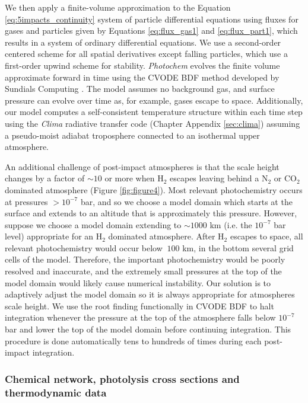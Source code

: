 We then apply a finite-volume approximation to the Equation \eqref{eq:5impacts_continuity} system of particle differential equations using fluxes for gases and particles given by Equations \eqref{eq:flux_gas1} and \eqref{eq:flux_part1}, which results in a system of ordinary differential equations. We use a second-order centered scheme for all spatial derivatives except falling particles, which use a first-order upwind scheme for stability. \emph{Photochem} evolves the finite volume approximate forward in time using the CVODE BDF method developed by Sundials Computing \citep{Hindmarsh_2005}. The model assumes no background gas, and surface pressure can evolve over time as, for example, gases escape to space. Additionally, our model computes a self-consistent temperature structure within each time step using the \emph{Clima} radiative transfer code (Chapter Appendix \ref{sec:clima}) assuming a pseudo-moist adiabat troposphere connected to an isothermal upper atmosphere.

An additional challenge of post-impact atmospheres is that the scale height changes by a factor of $\sim 10$ or more when H$_2$ escapes leaving behind a N$_2$ or CO$_2$ dominated atmosphere (Figure \ref{fig:figure4}). Most relevant photochemistry occurs at pressures $> 10^{-7}$ bar, and so we choose a model domain which starts at the surface and extends to an altitude that is approximately this pressure. However, suppose we choose a model domain extending to $\sim 1000$ km (i.e. the $10^{-7}$ bar level) appropriate for an H$_2$ dominated atmosphere. After H$_2$ escapes to space, all relevant photochemistry would occur below $~100$ km, in the bottom several grid cells of the model. Therefore, the important photochemistry would be poorly resolved and inaccurate, and the extremely small pressures at the top of the model domain would likely cause numerical instability. Our solution is to adaptively adjust the model domain so it is always appropriate for atmospheres scale height. We use the root finding functionally in CVODE BDF to halt integration whenever the pressure at the top of the atmosphere falls below $10^{-7}$ bar and lower the top of the model domain before continuing integration. This procedure is done automatically tens to hundreds of times during each post-impact integration.

\subsubsection{Chemical network, photolysis cross sections and thermodynamic data} \label{sec:photochem_reactions}

